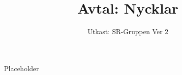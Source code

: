 \documentclass[a4paper]{dtek}
\title{Avtal: Nycklar}
\date{Utkast: SR-Gruppen Ver 2}
\begin{document}
Placeholder
\end{document}
